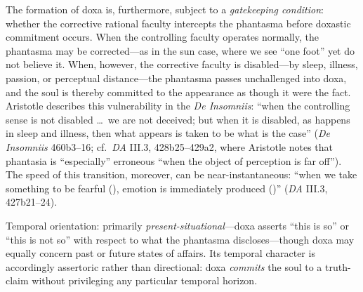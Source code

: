 \begin{itemize}
\begin{itemize}
\begin{itemize}
\begin{enumerate}
                  The formation of doxa is, furthermore, subject to a
                  \textit{gatekeeping condition}: whether the corrective rational
                  faculty intercepts the phantasma before doxastic commitment occurs.
                  When the controlling faculty operates normally, the phantasma may be
                  corrected---as in the sun case, where we see ``one foot'' yet do not
                  believe it. When, however, the corrective faculty is disabled---by
                  sleep, illness, passion, or perceptual distance---the phantasma
                  passes unchallenged into doxa, and the soul is thereby committed to
                  the appearance as though it were the fact. Aristotle describes this
                  vulnerability in the \textit{De Insomniis}: ``when the controlling
                  sense is not disabled \ldots\ we are not deceived; but when it is
                  disabled, as happens in sleep and illness, then what appears is taken
                  to be what is the case'' (\textit{De Insomniis} 460b3--16; cf.\
                  \textit{DA} III.3, 428b25--429a2, where Aristotle notes that
                  phantasia is ``especially'' erroneous ``when the object of perception
                  is far off''). The speed of this transition, moreover, can be
                  near-instantaneous: ``when we take something to be fearful
                  (\gk{δοξάσωμεν}), emotion is immediately produced
                  (\gk{εὐθὺς πάσχομεν})'' (\textit{DA} III.3, 427b21--24).

                  Temporal orientation: primarily \textit{present-situational}---doxa
                  asserts ``this is so'' or ``this is not so'' with respect to what the
                  phantasma discloses---though doxa may equally concern past or future
                  states of affairs. Its temporal character is accordingly assertoric
                  rather than directional: doxa \textit{commits} the soul to a
                  truth-claim without privileging any particular temporal horizon.



\end{enumerate}
\end{itemize}
\end{itemize}
\end{itemize}

